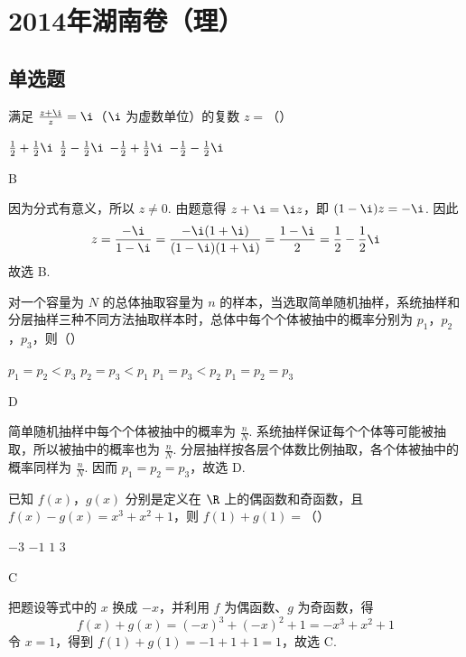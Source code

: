
\chapter{2014年湖南卷（理）}

\section{单选题}

\begin{problem}
满足 \(\frac{z + \i}{z} = \i\)（\(\i\) 为虚数单位）的复数 \(z =\)（\quad）

\choices
    {\(\frac{1}{2} + \frac{1}{2}\i\)}
    {\(\frac{1}{2} - \frac{1}{2}\i\)}
    {\(-\frac{1}{2} + \frac{1}{2}\i\)}
    {\(-\frac{1}{2} - \frac{1}{2}\i\)}
\begin{answer}
B
\end{answer}

\begin{solution}
因为分式有意义，所以 \(z\ne0\). 由题意得 \(z+\i=\i z\)，即 \((1-\i)z=-\i\). 因此
\[
z=\frac{-\i}{1-\i}=\frac{-\i(1+\i)}{(1-\i)(1+\i)}=\frac{1-\i}{2}=\frac{1}{2}-\frac{1}{2}\i
\]
故选 B.
\end{solution}
\end{problem}

\begin{problem}
对一个容量为 \(N\) 的总体抽取容量为 \(n\) 的样本，当选取简单随机抽样，系统抽样和分层抽样三种不同方法抽取样本时，总体中每个个体被抽中的概率分别为 \(p_1\)，\(p_2\)，\(p_3\)，则（\quad）

\choices
    {\(p_1 = p_2 < p_3\)}
    {\(p_2 = p_3 < p_1\)}
    {\(p_1 = p_3 < p_2\)}
    {\(p_1 = p_2 = p_3\)}
\begin{answer}
D
\end{answer}

\begin{solution}
简单随机抽样中每个个体被抽中的概率为 \(\frac{n}{N}\). 系统抽样保证每个个体等可能被抽取，所以被抽中的概率也为 \(\frac{n}{N}\). 分层抽样按各层个体数比例抽取，各个体被抽中的概率同样为 \(\frac{n}{N}\). 因而 \(p_1=p_2=p_3\)，故选 D.
\end{solution}
\end{problem}

\begin{problem}
已知 \( f(x) \)，\( g(x) \) 分别是定义在 \(\R\) 上的偶函数和奇函数，且 \( f(x) - g(x) = x^{3} + x^{2} + 1 \)，则 \( f(1) + g(1) = \)（\quad）

\choices
    {\(-3\)}
    {\(-1\)}
    {\(1\)}
    {\(3\)}
\begin{answer}
C
\end{answer}

\begin{solution}
把题设等式中的 \(x\) 换成 \(-x\)，并利用 \(f\) 为偶函数、\(g\) 为奇函数，得
\[
f(x)+g(x)=(-x)^3+(-x)^2+1=-x^3+x^2+1
\]
令 \(x=1\)，得到 \(f(1)+g(1)=-1+1+1=1\)，故选 C.
\end{solution}
\end{problem}


